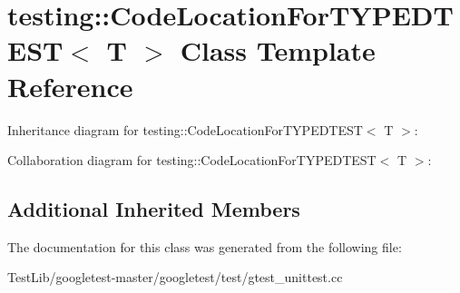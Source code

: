\hypertarget{classtesting_1_1CodeLocationForTYPEDTEST}{}\section{testing\+:\+:Code\+Location\+For\+T\+Y\+P\+E\+D\+T\+E\+ST$<$ T $>$ Class Template Reference}
\label{classtesting_1_1CodeLocationForTYPEDTEST}


Inheritance diagram for testing\+:\+:Code\+Location\+For\+T\+Y\+P\+E\+D\+T\+E\+ST$<$ T $>$\+:


Collaboration diagram for testing\+:\+:Code\+Location\+For\+T\+Y\+P\+E\+D\+T\+E\+ST$<$ T $>$\+:
\subsection*{Additional Inherited Members}


The documentation for this class was generated from the following file\+:\begin{DoxyCompactItemize}
\item 
Test\+Lib/googletest-\/master/googletest/test/gtest\+\_\+unittest.\+cc\end{DoxyCompactItemize}
